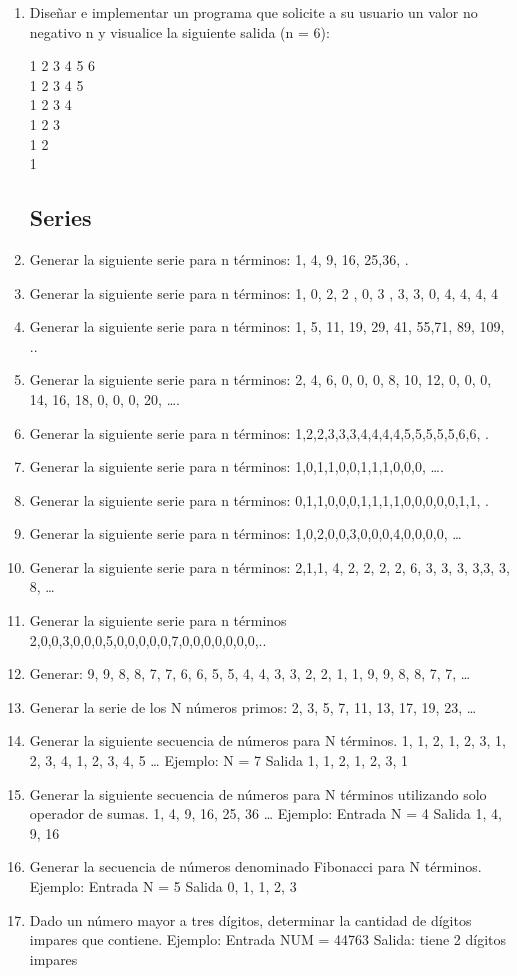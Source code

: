\documentclass{scrartcl}
\begin{document}
\begin{enumerate}
		\item Diseñar e implementar un programa que solicite a su usuario un valor no negativo
		n y visualice la siguiente salida (n = 6):
		
		1 2 3 4 5 6\\
		1 2 3 4 5\\
		1 2 3 4\\
		1 2 3\\
		1 2\\
		1\\
		
		\subsection{Series}
		
		\item Generar la siguiente serie para n términos: 1, 4, 9, 16, 25,36, .
		\item Generar la siguiente serie para n términos: 1, 0, 2, 2 , 0, 3 , 3, 3, 0, 4, 4, 4, 4
		\item Generar la siguiente serie para n términos: 1, 5, 11, 19, 29, 41, 55,71, 89, 109, ..
		\item Generar la siguiente serie para n términos:
		2, 4, 6, 0, 0, 0, 8, 10, 12, 0, 0, 0, 14, 16, 18, 0, 0, 0, 20, ….
		\item Generar la siguiente serie para n términos: 1,2,2,3,3,3,4,4,4,4,5,5,5,5,5,6,6, .
		\item Generar la siguiente serie para n términos: 1,0,1,1,0,0,1,1,1,0,0,0, ….
		\item Generar la siguiente serie para n términos: 0,1,1,0,0,0,1,1,1,1,0,0,0,0,0,1,1, .
		\item Generar la siguiente serie para n términos: 1,0,2,0,0,3,0,0,0,4,0,0,0,0, …
		\item Generar la siguiente serie para n términos:
		2,1,1, 4, 2, 2, 2, 2, 6, 3, 3, 3, 3,3, 3, 8, …
		\item Generar la siguiente serie para n términos 2,0,0,3,0,0,0,5,0,0,0,0,0,7,0,0,0,0,0,0,0,..
		\item Generar: 9, 9, 8, 8, 7, 7, 6, 6, 5, 5, 4, 4, 3, 3, 2, 2, 1, 1, 9, 9, 8, 8, 7, 7, …
		\item Generar la serie de los N números primos: 2, 3, 5, 7, 11, 13, 17, 19, 23, …
		\item Generar la siguiente secuencia de números para N términos.
		1, 1, 2, 1, 2, 3, 1, 2, 3, 4, 1, 2, 3, 4, 5 …
		Ejemplo: N = 7
		Salida 1, 1, 2, 1, 2, 3, 1
		\item Generar la siguiente secuencia de números para N términos utilizando solo operador de sumas.
		1, 4, 9, 16, 25, 36 …
		Ejemplo: Entrada
		N = 4
		Salida 1, 4, 9, 16
		\item Generar la secuencia de números denominado Fibonacci para N términos.
		Ejemplo: Entrada
		N = 5
		Salida 0, 1, 1, 2, 3
		\item Dado un número mayor a tres dígitos, determinar la cantidad de dígitos impares que contiene.
		Ejemplo: Entrada
		NUM = 44763
		Salida:
		tiene 2 dígitos impares
		

\end{enumerate}
\end{document}

